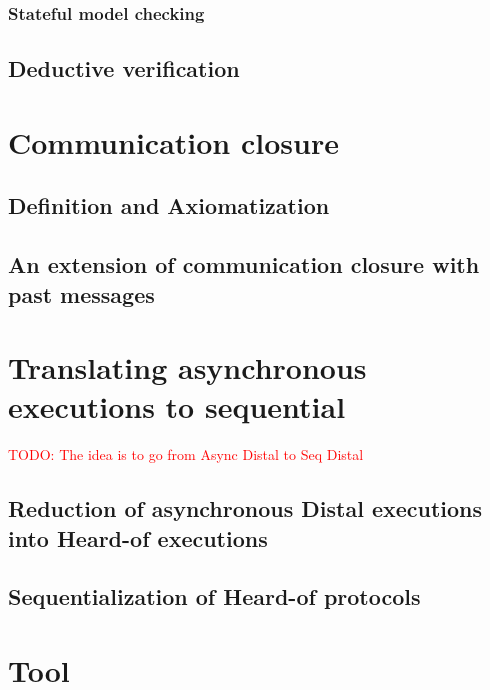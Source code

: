 \documentclass[11pt]{report}
\theoremstyle{plain}
\theoremstyle{definition}
\newcommand{\todo}[1]{\textcolor{red}{TODO: #1}}
\begin{document}
        \subsection{Stateful model checking}

    \section{Deductive verification}
    \label{preliminaries:verification}
    

\chapter{Communication closure}
\label{commclosure}
    \section{Definition and Axiomatization}
    \label{commclosure:definition}
    

    \section{An extension of communication closure with past messages}
    \label{commclosure:extension}
    

\chapter{Translating asynchronous executions to sequential}
\label{reduction}
    \todo{The idea is to go from Async Distal to Seq Distal}
    \section{Reduction of asynchronous Distal executions into Heard-of executions}
    \label{reduction:synchronization}
    

    \section{Sequentialization of Heard-of protocols}
    \label{reduction:sequentialization}
    

\chapter{Tool}
\label{tool}
\end{document}
